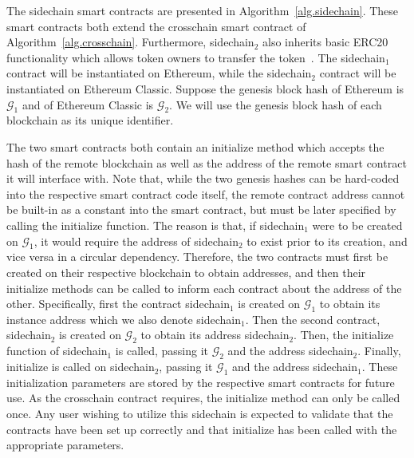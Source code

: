 The sidechain smart contracts are presented in Algorithm~\ref{alg.sidechain}.
These smart contracts both extend the \textsf{crosschain} smart contract of
Algorithm~\ref{alg.crosschain}. Furthermore, \textsf{sidechain}$_2$ also
inherits basic \textsf{ERC20} functionality which allows token owners to
transfer the token~\cite{openzeppelin-erc20}. The \textsf{sidechain}$_1$
contract will be instantiated on Ethereum, while the \textsf{sidechain}$_2$
contract will be instantiated on Ethereum Classic. Suppose the genesis block
hash of Ethereum is $\mathcal{G}_1$ and of Ethereum Classic is $\mathcal{G}_2$.
We will use the genesis block hash of each blockchain as its unique identifier.

The two smart contracts both contain an \textsf{initialize} method which accepts
the hash of the remote blockchain as well as the address of the remote smart
contract it will interface with. Note that, while the two genesis hashes can be
hard-coded into the respective smart contract code itself, the remote contract
address cannot be built-in as a constant into the smart contract, but must be
later specified by calling the \textsf{initialize} function. The reason is that,
if \textsf{sidechain}$_1$ were to be created on $\mathcal{G}_1$, it would
require the address of \textsf{sidechain}$_2$ to exist prior to its creation,
and vice versa in a circular dependency. Therefore, the two contracts must first
be created on their respective blockchain to obtain addresses, and then their
\textsf{initialize} methods can be called to inform each contract about the
address of the other. Specifically, first the contract \textsf{sidechain}$_1$ is
created on $\mathcal{G}_1$ to obtain its instance address which we also
denote \textsf{sidechain}$_1$. Then the second contract, \textsf{sidechain}$_2$
is created on $\mathcal{G}_2$ to obtain its address \textsf{sidechain}$_2$.
Then, the \textsf{initialize} function of \textsf{sidechain}$_1$ is called,
passing it $\mathcal{G}_2$ and the address \textsf{sidechain}$_2$. Finally,
\textsf{initialize} is called on \textsf{sidechain}$_2$, passing it
$\mathcal{G}_1$ and the address \textsf{sidechain}$_1$. These initialization
parameters are stored by the respective smart contracts for future use. As the
\textsf{crosschain} contract requires, the \textsf{initialize} method can only
be called once. Any user wishing to utilize this sidechain is expected to
validate that the contracts have been set up correctly and that
\textsf{initialize} has been called with the appropriate parameters.

